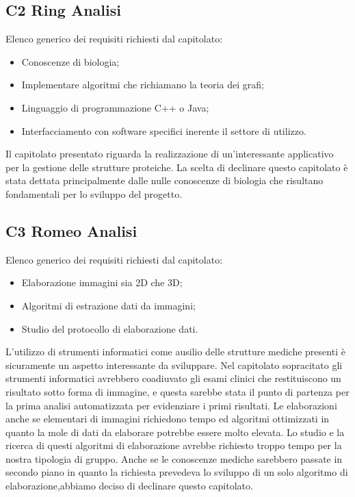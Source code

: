 \subsection{C2 Ring Analisi}
Elenco generico dei requisiti richiesti dal capitolato:
\begin{itemize} 
\item Conoscenze di biologia;
\item Implementare algoritmi che richiamano la teoria dei grafi;
\item Linguaggio di programmazione C++ o Java;
\item Interfacciamento con software specifici inerente il settore di utilizzo.
\end{itemize}
Il capitolato presentato riguarda la realizzazione di un'interessante applicativo per la gestione delle strutture proteiche. La scelta di declinare questo capitolato è stata dettata principalmente dalle nulle conoscenze di biologia che risultano fondamentali per lo sviluppo del progetto.\\
\subsection{C3 Romeo Analisi}
Elenco generico dei requisiti richiesti dal capitolato:
\begin{itemize} 
\item Elaborazione immagini sia 2D che 3D;
\item Algoritmi di estrazione dati da immagini;
\item Studio del protocollo di elaborazione dati.
\end{itemize}
L'utilizzo di strumenti informatici come ausilio delle strutture mediche presenti è sicuramente un aspetto interessante da sviluppare. Nel capitolato sopracitato gli strumenti informatici avrebbero coadiuvato gli esami clinici che restituiscono un risultato sotto forma di immagine, e questa sarebbe stata il punto di partenza per la prima analisi automatizzata per evidenziare i primi risultati. Le elaborazioni anche se elementari di immagini richiedono tempo ed algoritmi ottimizzati in quanto la mole di dati da elaborare potrebbe essere molto elevata. Lo studio e la ricerca di questi algoritmi di elaborazione avrebbe richiesto troppo tempo per la nostra tipologia di gruppo. Anche se le conoscenze mediche sarebbero passate in secondo piano in quanto la richiesta prevedeva lo sviluppo di un solo algoritmo di elaborazione,abbiamo deciso di declinare questo capitolato.   \\

